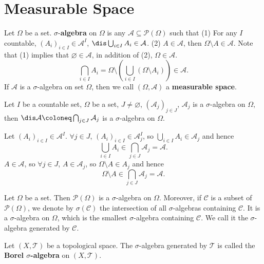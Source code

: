 \section{Measurable Space}
\begin{definitionenv}
    Let $\Omega$ be a set. $\sigma$-\textbf{algebra} on $\Omega$ is any $\mathcal{A}\subseteq \mathscr{P}(\Omega)$ such that
    \newline
    (1) For any $I$ countable, $(A_i)_{i\in I}\in \mathcal{A}^{I}$, $\dis \bigcup_{i\in I}A_i\in \mathcal{A}$.
    \newline
    (2) $A\in \mathcal{A}$, then $\Omega\setminus A\in \mathcal{A}$.
    \newline
    Note that (1) implies that $\varnothing\in \mathcal{A}$, in addition of (2), $\Omega\in \mathcal{A}$.
    $$ \bigcap_{i\in I}A_i=\Omega \setminus \left(\bigcup_{i\in I}\left(\Omega\setminus A_i\right)\right)\in \mathcal{A}.$$
    If $\mathcal{A}$ is a $\sigma$-algebra on set $\Omega$, then we call $(\Omega,\mathcal{A})$ a \textbf{measurable space}.
\end{definitionenv}
\begin{propositionenv}
    Let $I$ be a countable set, $\Omega$ be a set, $J\neq \varnothing$, $(\mathcal{A}_{j})_{j\in J}$, $\mathcal{A}_j$ is a $\sigma$-algebra on $\Omega$, then $\dis \mathcal{A}\coloneq \bigcap_{j\in J}\mathcal{A}_j$  is a $\sigma$-algebra on $\Omega$.
\end{propositionenv}
\begin{proofenv}
    Let $(A_i)_{i\in I}\in \mathcal{A}^I$. $\forall j\in J$, $(A_i)_{i\in I}\in \mathcal{A}_j^I$, so $\bigcup_{i\in I} A_i\in \mathcal{A}_j$ and hence
    $$ \bigcup_{i\in I} A_i\in \bigcap_{j\in J}\mathcal{A}_j=\mathcal{A}.$$
    $A\in \mathcal{A}$, so $\forall j\in J$, $A\in \mathcal{A}_j$, so $\Omega\setminus A\in A_j$ and hence
    $$ \Omega\setminus A\in \bigcap_{j\in J} \mathcal{A}_j =\mathcal{A}.$$
\end{proofenv}
\begin{exampleenv}
    Let \(\Omega\) be a set. Then \(\mathscr{P}(\Omega)\) is a \(\sigma\)-algebra on \(\Omega\). Moreover, if \(\mathcal{C}\) is a subset of \(\mathscr{P}(\Omega)\), we denote by \(\sigma(\mathcal{C})\) the intersection of all \(\sigma\)-algebras containing \(\mathcal{C}\). It is a \(\sigma\)-algebra on \(\Omega\), which is the smallest \(\sigma\)-algebra containing \(\mathcal{C}\). We call it the \(\sigma\)-algebra generated by \(\mathcal{C}\).
\end{exampleenv}
\begin{exampleenv}
    Let $(X,\mathscr{T})$ be a topological space. The $\sigma$-algebra generated by $\mathscr{T}$ is called the \textbf{Borel $\sigma$-algebra} on $(X,\mathscr{T})$.
\end{exampleenv}
